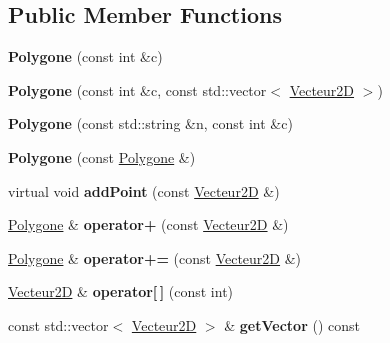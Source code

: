 \subsection*{Public Member Functions}
\begin{DoxyCompactItemize}
\item 
\mbox{\label{class_polygone_a1510ddc356cdbb799782e22bc487a59e}} 
{\bfseries Polygone} (const int \&c)
\item 
\mbox{\label{class_polygone_aaf1c50570515d23aa1a32036b1000130}} 
{\bfseries Polygone} (const int \&c, const std\+::vector$<$ \mbox{\hyperlink{class_vecteur2_d}{Vecteur2D}} $>$)
\item 
\mbox{\label{class_polygone_abdf1d57af7096ffd7adc2477798d821d}} 
{\bfseries Polygone} (const std\+::string \&n, const int \&c)
\item 
\mbox{\label{class_polygone_ad50701c17d6c259eb88c69355e6d4040}} 
{\bfseries Polygone} (const \mbox{\hyperlink{class_polygone}{Polygone}} \&)
\item 
\mbox{\label{class_polygone_ad0de0795df9b5407cde393ce4aaa95eb}} 
virtual void {\bfseries add\+Point} (const \mbox{\hyperlink{class_vecteur2_d}{Vecteur2D}} \&)
\item 
\mbox{\label{class_polygone_a333f32a9482260ae403eb60502e558bd}} 
\mbox{\hyperlink{class_polygone}{Polygone}} \& {\bfseries operator+} (const \mbox{\hyperlink{class_vecteur2_d}{Vecteur2D}} \&)
\item 
\mbox{\label{class_polygone_a389bb7380a87ab5ed95d08d4ae272d24}} 
\mbox{\hyperlink{class_polygone}{Polygone}} \& {\bfseries operator+=} (const \mbox{\hyperlink{class_vecteur2_d}{Vecteur2D}} \&)
\item 
\mbox{\label{class_polygone_a928bdd7cd9dd5ab7c9c96a0e27f448d0}} 
\mbox{\hyperlink{class_vecteur2_d}{Vecteur2D}} \& {\bfseries operator\mbox{[}$\,$\mbox{]}} (const int)
\item 
\mbox{\label{class_polygone_a0fd3a383b6749505feaa96060eac767d}} 
const std\+::vector$<$ \mbox{\hyperlink{class_vecteur2_d}{Vecteur2D}} $>$ \& {\bfseries get\+Vector} () const

\end{DoxyCompactItemize}
